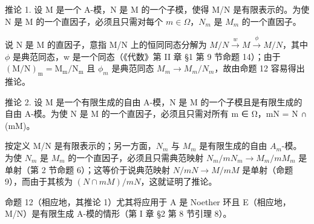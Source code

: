 推论 1. 设 M 是一个 A-模，N 是 M 的一个子模，使得 M/N 是有限表示的。为使 N 是 M 的一个直因子，必须且只需对每个 \(m \in \Omega\)，\(N_{m}\) 是 \(M_{m}\) 的一个直因子。

说 N 是 M 的直因子，意指 M/N 上的恒同同态分解为 \(M/N \xrightarrow{w} M \xrightarrow{\phi} M/N\)，其中 \(\phi\) 是典范同态，w 是一个同态（《代数》第 II 章 §1 第 9 节命题 14）；由于 \((\mathrm{M}/\mathrm{N})_{\mathrm{m}} = \mathrm{M}_{\mathrm{m}}/\mathrm{N}_{\mathrm{m}}\) 且 \(\phi_{m}\) 是典范同态 \(M_{m} \to M_{m}/N_{m}\)，故由命题 12 容易得出推论。

推论 2. 设 M 是一个有限生成的自由 A-模，N 是 M 的一个子模且是有限生成的自由 A-模。为使 N 是 M 的一个直因子，必须且只需对所有 m ∈ Ω，mN = N ∩ (mM)。

按定义 M/N 是有限表示的；另一方面，\(N_{m}\) 与 \(M_{m}\) 是有限生成的自由 \(A_{m}\)-模。为使 \(N_{m}\) 是 \(M_{m}\) 的一个直因子，必须且只需典范映射 \(N_{m}/mN_{m} \rightarrow M_{m}/mM_{m}\) 是单射（第 2 节命题 6）；这等价于说典范映射 \(N/mN \rightarrow M/mM\) 是单射（命题 9），而由于其核为 \((N \cap mM)/mN\)，这就证明了推论。

命题 12（相应地，其推论 1）尤其将应用于 A 是 Noether 环且 E（相应地，M/N）是有限生成 A-模的情形（第 I 章 §2 第 8 节引理 8）。

